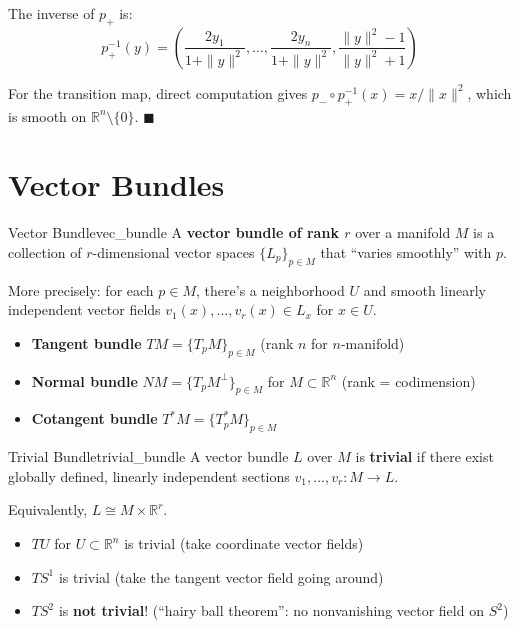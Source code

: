 \documentclass[11pt, letterpaper, openany]{book}
\renewenvironment{proof}[1][\proofname]{%
  \tcolorbox[blanker, breakable, left=1em,
    before skip=1em, after skip=1em,
    borderline west={2pt}{0pt}{MagicTeal!50},
    colback=MagicCream,
    before upper={\textcolor{MagicTeal}{\sffamily\bfseries #1.}\space}
  ]%
}{%
  \hfill\textcolor{MagicTeal}{\ensuremath{\blacksquare}}\endtcolorbox%
}
\begin{document}
\begin{proof}
The inverse of $p_+$ is:
\[p_+^{-1}(y) = \left(\frac{2y_1}{1 + \|y\|^2}, \ldots, \frac{2y_n}{1 + \|y\|^2}, \frac{\|y\|^2 - 1}{\|y\|^2 + 1}\right)\]

For the transition map, direct computation gives $p_- \circ p_+^{-1}(x) = x/\|x\|^2$, which is smooth on $\mathbb{R}^n \setminus \{0\}$.
\end{proof}

\section{Vector Bundles}

\begin{defn}{Vector Bundle}{vec_bundle}
A \textbf{vector bundle of rank $r$} over a manifold $M$ is a collection of $r$-dimensional vector spaces $\{L_p\}_{p \in M}$ that ``varies smoothly'' with $p$.

More precisely: for each $p \in M$, there's a neighborhood $U$ and smooth linearly independent vector fields $v_1(x), \ldots, v_r(x) \in L_x$ for $x \in U$.
\end{defn}

\begin{example}
\begin{itemize}
    \item \textbf{Tangent bundle} $TM = \{T_p M\}_{p \in M}$ (rank $n$ for $n$-manifold)
    \item \textbf{Normal bundle} $NM = \{T_p M^\perp\}_{p \in M}$ for $M \subset \mathbb{R}^n$ (rank = codimension)
    \item \textbf{Cotangent bundle} $T^*M = \{T_p^* M\}_{p \in M}$
\end{itemize}
\end{example}

\begin{defn}{Trivial Bundle}{trivial_bundle}
A vector bundle $L$ over $M$ is \textbf{trivial} if there exist globally defined, linearly independent sections $v_1, \ldots, v_r: M \to L$.

Equivalently, $L \cong M \times \mathbb{R}^r$.
\end{defn}

\begin{example}
\begin{itemize}
    \item $TU$ for $U \subset \mathbb{R}^n$ is trivial (take coordinate vector fields)
    \item $TS^1$ is trivial (take the tangent vector field going around)
    \item $TS^2$ is \textbf{not trivial}! (``hairy ball theorem'': no nonvanishing vector field on $S^2$)
\end{itemize}
\end{example}
\end{document}
